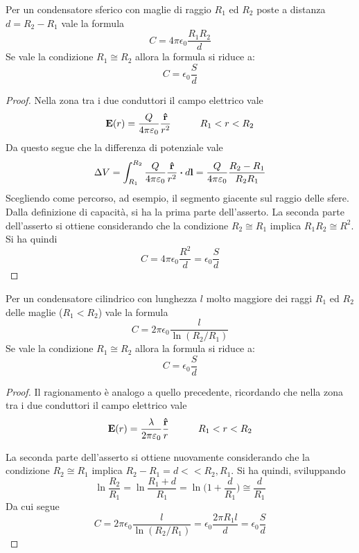 \begin{obs}
    Per un condensatore sferico con maglie di raggio $R_1$ ed $R_2$  poste a distanza $d=R_2-R_1$ vale la formula
    \begin{equation}
        \label{eqn:capacità_sferico}
        C=4\pi\epsilon_0\frac{R_1R_2}{d}
    \end{equation}
    Se vale la condizione $R_1\cong R_2$ allora la formula si riduce a:
    \[
        C=\epsilon_0\frac{S}{d}
    \]
\end{obs}
\begin{proof}
    Nella zona tra i due conduttori il campo elettrico vale
    \[
        \vb{E}(r)=\frac{Q}{4\pi\varepsilon_0}\frac{\vu{r}}{r^2} \quad\quad\quad R_1<r<R_2
    \]
    Da questo segue che la differenza di potenziale vale
    \[
        \Delta V=\int_{R_1}^{R_2} \frac{Q}{4\pi\epsilon_0}\frac{\vu{r}}{r^2} \vdot d\vb{l}=\frac{Q}{4\pi\epsilon_0}\frac{R_2-R_1}{R_2R_1}
    \]
    Scegliendo come percorso, ad esempio, il segmento giacente sul raggio delle sfere. Dalla definizione di capacità, si
    ha la prima parte dell'asserto.
    La seconda parte dell'asserto si ottiene considerando che la condizione $R_2\cong R_1$ implica $R_1R_2\cong R^2$. Si ha quindi
    \[
        C=4\pi\epsilon_0\frac{R^2}{d}=\epsilon_0\frac{S}{d}
    \]
\end{proof}

\begin{obs}
    Per un condensatore cilindrico con lunghezza $l$ molto maggiore dei raggi $R_1$ ed $R_2$ delle maglie ($R_1<R_2$) vale la formula
    \begin{equation}
        \label{eqn:capacità_cilindirco}
        C=2\pi\epsilon_0\frac{l}{\ln(R_2/R_1)}
    \end{equation}
    Se vale la condizione $R_1\cong R_2$ allora la formula si riduce a:
    \[
        C=\epsilon_0\frac{S}{d}
    \]
\end{obs}
\begin{proof}
    Il ragionamento è analogo a quello precedente, ricordando che nella zona tra i due conduttori il campo elettrico vale
    \[
        \vb{E}(r)=\frac{\lambda}{2\pi\varepsilon_0}\frac{\vu{r}}{r} \quad\quad\quad R_1<r<R_2
    \]

    La seconda parte dell'asserto si ottiene nuovamente considerando che la condizione $R_2\cong R_1$ implica $R_2-R_1=d<<R_2,R_1$.
    Si ha quindi, sviluppando
    \[
        \ln\frac{R_2}{R_1}=\ln\frac{R_1+d}{R_1}=\ln\Biggl(1+\frac{d}{R_1} \Biggr)\cong \frac{d}{R_1}
    \]
    Da cui segue
    \[
        C=2\pi\epsilon_0\frac{l}{\ln(R_2/R_1)}=\epsilon_0\frac{2\pi R_1 l}{d}=\epsilon_0\frac{S}{d}
    \]
\end{proof}



